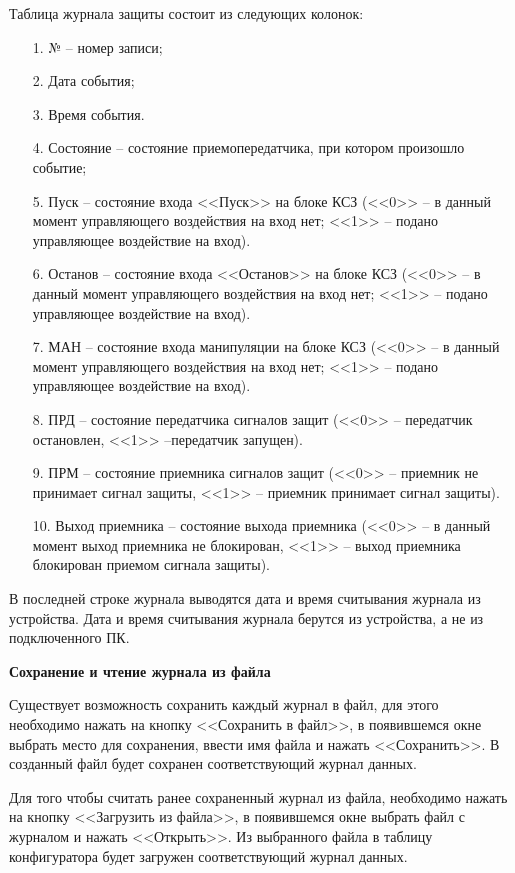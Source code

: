 Таблица журнала защиты состоит из следующих колонок:
\begin{enumerate}
	\item[1.] № – номер записи;
	\item[2.] Дата события;
	\item[3.] Время события.
	\item[4.] Состояние – состояние приемопередатчика, при котором произошло событие;
	\item[5.] Пуск – состояние входа <<Пуск>> на блоке КСЗ (<<0>> – в данный момент управляющего воздействия на вход нет; <<1>> – подано управляющее воздействие на вход).
	\item[6.] Останов – состояние входа <<Останов>> на блоке КСЗ (<<0>> – в данный момент управляющего воздействия на вход нет; <<1>> – подано управляющее воздействие на вход).
	\item[7.] МАН – состояние входа манипуляции на блоке КСЗ (<<0>> – в данный момент управляющего воздействия на вход нет; <<1>> – подано управляющее воздействие на вход).
	\item[8.] ПРД – состояние передатчика сигналов защит (<<0>> – передатчик остановлен, <<1>> –передатчик запущен).
	\item[9.] ПРМ – состояние приемника сигналов защит (<<0>> – приемник не принимает сигнал защиты, <<1>> – приемник принимает сигнал защиты).
	\item[10.] Выход приемника – состояние выхода приемника (<<0>> – в данный момент выход приемника не блокирован, <<1>> – выход приемника блокирован приемом сигнала защиты).
\end{enumerate}
	
В последней строке журнала выводятся дата и время считывания журнала из устройства. Дата и время считывания журнала берутся из устройства, а не из подключенного ПК.	
\newline		

\textbf{Сохранение и чтение журнала из файла}

Существует возможность сохранить каждый журнал в файл, для этого необходимо нажать на кнопку <<Сохранить в файл>>, в появившемся окне выбрать место для сохранения, ввести имя файла и нажать <<Сохранить>>. В созданный файл будет сохранен соответствующий журнал данных. 

Для того чтобы считать ранее сохраненный журнал из файла, необходимо нажать на кнопку <<Загрузить из файла>>, в появившемся окне выбрать файл с журналом и нажать <<Открыть>>. Из выбранного файла в таблицу конфигуратора будет загружен соответствующий журнал данных.


